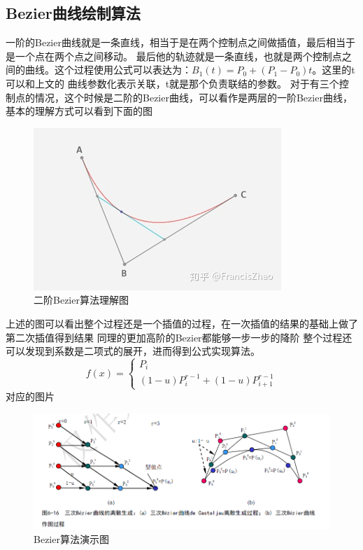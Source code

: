 \documentclass[a4paper,UTF8]{article}
\theoremstyle{definition}
\begin{document}
\subsection{Bezier曲线绘制算法}
一阶的Bezier曲线就是一条直线，相当于是在两个控制点之间做插值，最后相当于是一个点在两个点之间移动。
最后他的轨迹就是一条直线，也就是两个控制点之间的曲线。这个过程使用公式可以表达为：$ B_{1}(t)=P_0+(P_1-P_0) t$。这里的t可以和上文的
曲线参数化表示关联，t就是那个负责联结的参数。
对于有三个控制点的情况，这个时候是二阶的Bezier曲线，可以看作是两层的一阶Bezier曲线，基本的理解方式可以看到下面的图

\begin{figure}[h]
	\centering
	\includegraphics[scale=0.8]{figure/b.png}
	\caption{二阶Bezier算法理解图}
	\label{fig:bezier-alg}
\end{figure}

上述的图可以看出整个过程还是一个插值的过程，在一次插值的结果的基础上做了第二次插值得到结果
同理的更加高阶的Bezier都能够一步一步的降阶
整个过程还可以发现到系数是二项式的展开，进而得到公式实现算法。\\

$$f(x)=
\begin{cases}
    P_{i}  \\
    (1-u)P_{i}^{r-1}+(1-u)P_{i+1}^{r-1}
\end{cases}
$$
对应的图片
\begin{figure}[h]
	\centering
	\includegraphics[scale=0.6]{figure/bezier2.png}
	\caption{Bezier算法演示图}
	\label{fig:bezier2}
\end{figure}
\end{document}
